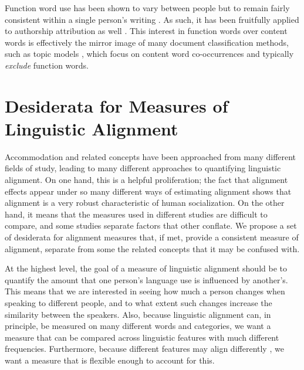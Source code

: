\documentclass{acm_proc_article-sp}
\begin{document}
Function word use has been shown to vary between people but to remain fairly consistent within a single person's writing \cite{PennebakerKing1999}. As such, it has been fruitfully applied to authorship attribution as well \cite{?}. This interest in function words over content words is effectively the mirror image of many document classification methods, such as topic models \cite{BleiNgJordan2003}, which focus on content word co-occurrences and typically \emph{exclude} function words.




\section{Desiderata for Measures of Linguistic Alignment }

Accommodation and related concepts have been approached from many different fields of study, leading to many different approaches to quantifying linguistic alignment. On one hand, this is a helpful proliferation; the fact that alignment effects appear under so many different ways of estimating alignment shows that alignment is a very robust characteristic of human socialization.  On the other hand, it means that the measures used in different studies are difficult to compare, and some studies separate factors that other conflate. We propose a set of desiderata for alignment measures that, if met, provide a consistent measure of alignment, separate from some the related concepts that it may be confused with.

At the highest level, the goal of a measure of linguistic alignment should be to quantify the amount that one person's language use is influenced by another's. This means that we are interested in seeing how much a person changes when speaking to different people, and to what extent such changes increase the similarity between the speakers. Also, because linguistic alignment can, in principle, be measured on many different words and categories, we want a measure that can be compared across linguistic features with much different frequencies.  Furthermore, because different features may align differently \cite{Ferrara1991}, we want a measure that is flexible enough to account for this.
\end{document}
